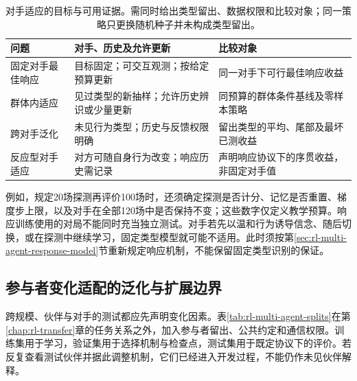 \begin{table}[htbp]
 \centering
 \begin{tabularx}{\linewidth}{@{}l >{\raggedright\arraybackslash}X >{\raggedright\arraybackslash}X@{}}
 \toprule
 问题 & 对手、历史及允许更新 & 比较对象\\
 \midrule
 固定对手最佳响应 & 目标固定；可交互观测；按给定预算更新 & 同一对手下可行最佳响应收益\\
 群体内适应 & 见过类型的新抽样；允许历史辨识或少量更新 & 同预算的群体条件基线及零样本策略\\
 跨对手泛化 & 未见行为类型；历史与反馈权限明确 & 留出类型的平均、尾部及最坏已测收益\\
 反应型对手适应 & 对方可随自身行为改变；响应历史需记录 & 声明响应协议下的序贯收益，非固定对手值\\
 \bottomrule
 \end{tabularx}
 \caption{对手适应的目标与可用证据。需同时给出类型留出、数据权限和比较对象；同一策略只更换随机种子并未构成类型留出。}
 \label{tab:rl-multi-agent-opponent-adaptation}
\end{table}

例如，规定20场探测再评价100场时，还须确定探测是否计分、记忆是否重置、梯度步上限，以及对手在全部120场中是否保持不变；这些数字仅定义教学预算。响应训练使用的对局不能同时充当独立测试。对手若先以温和行为诱导信念、随后切换，或在探测中继续学习，固定类型模型就可能不适用。此时须按第\ref{sec:rl-multi-agent-response-model}节重新规定响应机制，不能保留固定类型识别的保证。

\subsection{参与者变化适配的泛化与扩展边界}
\label{sec:rl-multi-agent-generalization}

跨规模、伙伴与对手的测试都应先声明变化因素。表\ref{tab:rl-multi-agent-splits}在第\ref{chap:rl-transfer}章的任务关系之外，加入参与者留出、公共约定和通信权限。训练集用于学习，验证集用于选择机制与检查点，测试集用于既定协议下的评价。若反复查看测试伙伴并据此调整机制，它们已经进入开发过程，不能仍作未见伙伴解释。

